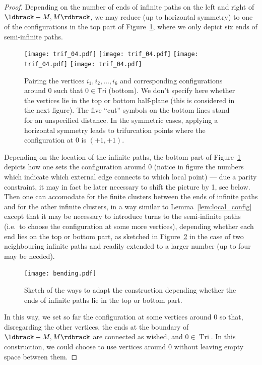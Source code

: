 \documentclass[12pt]{amsart}
\DeclareMathOperator{\Tri}{Tri}
\theoremstyle{remark}
\newcommand{\Li}{\ldbrack} %
\newcommand{\Ri}{\rdbrack}
\begin{document}
\begin{proof}
Depending on the number of ends of infinite paths on the left and right of $\Li-M,M\Ri$, we may reduce (up to horizontal symmetry) to one of the configurations in the top part of Figure~\ref{fig:pair_infinite}, where we only depict six ends of semi-infinite paths. 
\begin{figure}
\texttt{[image: trif\_04.pdf]}
\texttt{[image: trif\_04.pdf]}
\texttt{[image: trif\_04.pdf]}
\texttt{[image: trif\_04.pdf]}
\caption{Pairing the vertices $i_{1},i_{2}, \ldots, i_{6}$ and corresponding configurations around $0$ such that $0\in  \mathsf{Tri}$ (bottom). We don't specify here whether the vertices lie in the top or bottom half-plane (this is considered in the next figure). The five ``cut'' symbols on the bottom lines stand for an unspecified distance.
In the symmetric cases, applying a horizontal symmetry leads to trifurcation points where the configuration at $0$ is $(+1,+1)$.
}
\label{fig:pair_infinite}
\end{figure}

Depending on the location of the infinite paths, the bottom part of Figure~\ref{fig:pair_infinite} depicts how one sets the configuration around 0 (notice in figure the numbers which indicate which external edge connects to which local point) --- due a parity constraint, it may in fact be later necessary to shift the picture by 1, see below. Then one can accomodate for the finite clusters between the ends of infinite paths and for the other infinite clusters, in a way similar to Lemma~\ref{lem:local_config} except that it may be necessary to introduce turns to the semi-infinite paths (i.e.~to choose the configuration at some more vertices), depending whether each end lies on the top or bottom part, as sketched in Figure~\ref{fig:bending} in the case of two neighbouring infinite paths and readily extended to a larger number (up to four may be needed). 
\begin{figure}
\texttt{[image: bending.pdf]}

\caption{Sketch of the ways to adapt the construction depending whether the ends of infinite paths lie in the top or bottom part. 
}
\label{fig:bending}
\end{figure}

In this way, we set so far the configuration at some vertices around 0 so that, disregarding the other vertices, the ends at the boundary of $\Li-M,M\Ri$ are connected as wished, and $0\in  \Tri$. In this construction, we could choose to use vertices around 0 without leaving empty space between them. 


\end{proof}
\end{document}
